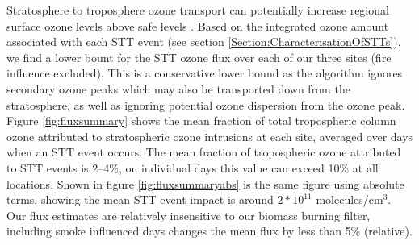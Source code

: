 \documentclass{article}
\begin{document}
  Stratosphere to troposphere ozone transport can potentially increase regional surface ozone levels above safe levels \citep{Zhang_2014}. 
  Based on the integrated ozone amount associated with each STT event (see section \ref{Section:CharacterisationOfSTTs}), we find a lower bount for the STT ozone flux over each of our three sites (fire influence excluded).
  This is a conservative lower bound as the algorithm ignores secondary ozone peaks which may also be transported down from the stratosphere, as well as ignoring potential ozone dispersion from the ozone peak.
  Figure \ref{fig:fluxsummary} shows the mean fraction of total tropospheric column ozone attributed to stratospheric ozone intrusions at each site, averaged over days when an STT event occurs.
  The mean fraction of tropospheric ozone attributed to STT events is 2--4\%, on individual days this value can exceed 10\% at all locations.
  Shown in figure \ref{fig:fluxsummaryabs} is the same figure using absolute terms, showing the mean STT event impact is around $2*10^{11}$ molecules/cm$^3$.
  Our flux estimates are relatively insensitive to our biomass burning filter, including smoke influenced days changes the mean flux by less than 5\% (relative).
  
\end{document}

